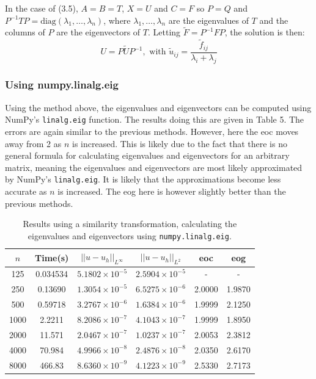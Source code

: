 \documentclass{article}
\numberwithin{equation}{section}
\begin{document}
In the case of (3.5), $A=B=T$, $X=U$ and $C=F$ so $P=Q$ and $P^{-1}TP = \text{diag}(\lambda_1, \dots, \lambda_n)$, where $\lambda_1, \dots, \lambda_n$ are the eigenvalues of $T$ and the columns of $P$ are the eigenvectors of $T$. Letting $\widetilde{F}=P^{-1}FP$, the solution is then:
\[ U = P \widetilde{U} P^{-1}, \text{ with } \widetilde{u}_{ij} = \frac{\widetilde{f}_{ij}}{\lambda_i + \lambda_j} \]

\subsubsection*{Using numpy.linalg.eig}
Using the method above, the eigenvalues and eigenvectors can be computed using NumPy's \texttt{linalg.eig} function. The results doing this are given in Table 5. The errors are again similar to the previous methods. However, here the eoc moves away from 2 as $n$ is increased. This is likely due to the fact that there is no general formula for calculating eigenvalues and eigenvectors for an arbitrary matrix, meaning the eigenvalues and eigenvectors are most likely approximated by NumPy's \texttt{linalg.eig}. It is likely that the approximations become less accurate as $n$ is increased. The eog here is however slightly better than the previous methods. 

\begin{table}[H]
\centering
\begin{tabular}{|c|c|c|c|c|c|}
\hline
$n$ & Time(s) & $|| u - u_h ||_{L^{\infty}}$ &$|| u - u_h ||_{L^{2}}$ & eoc & eog \\
\hline
125 & 0.034534 & $5.1802 \times 10^{-5}$ & $2.5904 \times 10^{-5}$ & -  & - \\
250 & 0.13690 & $1.3054 \times 10^{-5}$ & $6.5275 \times 10^{-6}$ & 2.0000 & 1.9870  \\
500 & 0.59718 & $3.2767 \times 10^{-6}$ & $1.6384 \times 10^{-6}$ & 1.9999 & 2.1250  \\
1000 & 2.2211 & $8.2086 \times 10^{-7}$ & $4.1043 \times 10^{-7}$ & 1.9999 & 1.8950  \\
2000 & 11.571 & $2.0467 \times 10^{-7}$ & $1.0237 \times 10^{-7}$ & 2.0053 & 2.3812  \\
4000 & 70.984 & $4.9966 \times 10^{-8}$ & $2.4876 \times 10^{-8}$ & 2.0350 & 2.6170  \\
8000 & 466.83 & $8.6360 \times 10^{-9}$ & $4.1223 \times 10^{-9}$ & 2.5330 & 2.7173  \\
\hline
\end{tabular}
\captionsetup{justification=centering}
\caption{Results using a similarity transformation, calculating the eigenvalues and eigenvectors using \texttt{numpy.linalg.eig}.}
\end{table}
\end{document}
